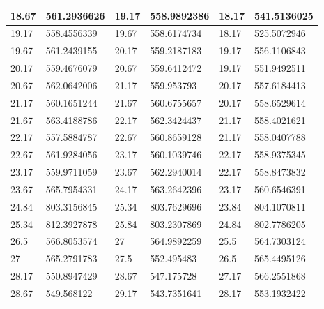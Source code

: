 \documentclass[11pt, letterpaper]{article}
\begin{document}
\begin{appendices}
\begin{table}[!ht]
\begin{tabular}{|l|l|l|l|l|l|}
        18.67 & 561.2936626 & 19.17 & 558.9892386 & 18.17 & 541.5136025 \\ \hline
        19.17 & 558.4556339 & 19.67 & 558.6174734 & 18.17 & 525.5072946 \\ \hline
        19.67 & 561.2439155 & 20.17 & 559.2187183 & 19.17 & 556.1106843 \\ \hline
        20.17 & 559.4676079 & 20.67 & 559.6412472 & 19.17 & 551.9492511 \\ \hline
        20.67 & 562.0642006 & 21.17 & 559.953793 & 20.17 & 557.6184413 \\ \hline
        21.17 & 560.1651244 & 21.67 & 560.6755657 & 20.17 & 558.6529614 \\ \hline
        21.67 & 563.4188786 & 22.17 & 562.3424437 & 21.17 & 558.4021621 \\ \hline
        22.17 & 557.5884787 & 22.67 & 560.8659128 & 21.17 & 558.0407788 \\ \hline
        22.67 & 561.9284056 & 23.17 & 560.1039746 & 22.17 & 558.9375345 \\ \hline
        23.17 & 559.9711059 & 23.67 & 562.2940014 & 22.17 & 558.8473832 \\ \hline
        23.67 & 565.7954331 & 24.17 & 563.2642396 & 23.17 & 560.6546391 \\ \hline
        24.84 & 803.3156845 & 25.34 & 803.7629696 & 23.84 & 804.1070811 \\ \hline
        25.34 & 812.3927878 & 25.84 & 803.2307869 & 24.84 & 802.7786205 \\ \hline
        26.5 & 566.8053574 & 27 & 564.9892259 & 25.5 & 564.7303124 \\ \hline
        27 & 565.2791783 & 27.5 & 552.495483 & 26.5 & 565.4495126 \\ \hline
        28.17 & 550.8947429 & 28.67 & 547.175728 & 27.17 & 566.2551868 \\ \hline
        28.67 & 549.568122 & 29.17 & 543.7351641 & 28.17 & 553.1932422 \\ \hline
    \end{tabular}
\end{table}


\end{appendices}
\end{document}
